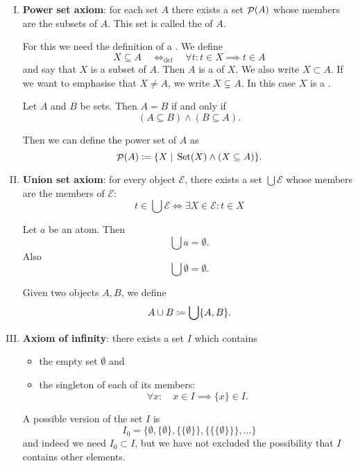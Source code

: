 \begin{enumerate}[(I)]
\item \textbf{Power set axiom}: for each set $A$ there exists a set $\mathop{\mathcal{P}}(A)$ whose members are the subsets of $A$. This set is called the  of $A$.
\begin{note}
For this we need the definition of a . We define
\[ X\subseteq A \quad \Leftrightarrow_\text{def} \quad \forall t:t\in X\implies t\in A  \]
and say that $X$ is a subset of $A$. Then $A$ is a  of $X$. We also write $X\subset A$. If we want to emphasise that $X\neq A$, we write $X\subsetneq A$. In this case $X$ is a .
\begin{lemma}
Let $A$ and $B$ be sets. Then $A = B$ \textup{if and only if}
\[ (A\subseteq B) \land (B\subseteq A). \]
\end{lemma}
\end{note}
Then we can define the power set of $A$ as
\[ \mathop{\mathcal{P}}(A) \coloneqq \{X \;|\; \operatorname{Set}(X) \land (X\subseteq A)\}. \]
\item \textbf{Union set axiom}: for every object $\mathcal{E}$, there exists a set $\bigcup \mathcal{E}$ whose members are the members of $\mathcal{E}$:
\[ t\in \bigcup\mathcal{E} \iff \exists X\in \mathcal{E}:t\in X \]
\begin{note}
\begin{lemma}
Let $a$ be an atom. Then
\[ \bigcup a = \emptyset. \]
Also
\[ \bigcup \emptyset = \emptyset. \]
\end{lemma}
\end{note}
\begin{note}
Given two objects $A,B$, we define
\[ A\cup B \coloneqq \bigcup \{ A,B \}. \]
\end{note}
\item \textbf{Axiom of infinity}: there exists a set $I$ which contains
\begin{itemize}
\item the empty set $\emptyset$ and
\item the singleton of each of its members:
\[ \forall x: \quad x\in I \implies \{x\}\in I. \]
\end{itemize}
\begin{note}
A possible version of the set $I$ is
\[ I_0 = \{ \emptyset, \{\emptyset\}, \{\{\emptyset\}\}, \{\{\{\emptyset\}\}\}, \ldots \} \]
and indeed we need $I_0\subset I$, but we have not excluded the possibility that $I$ contains other elements.
\end{note}
\end{enumerate}

